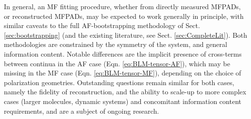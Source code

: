 In general, an MF fitting procedure, whether from directly measured MFPADs, or reconstructed MFPADs, may be expected to work generally in principle, with similar caveats to the full AF-bootstrapping methodology of Sect. \ref{sec:bootstrapping} (and the existing literature, see Sect. \ref{sec:CompleteLit}). Both methodologies are constrained by the symmetry of the system, and general information content. Notable differences are the implicit presence of cross-terms between continua in the AF case (Eqn. \ref{eq:BLM-tensor-AF}), which may be missing in the MF case (Eqn. \ref{eq:BLM-tensor-MF}), depending on the choice of polarization geometries.
Outstanding questions remain similar for both cases, namely the fidelity of reconstruction, and the ability to scale-up to more complex cases (larger molecules, dynamic systems) and concomitant information content requirements, and are a subject of ongoing research.



